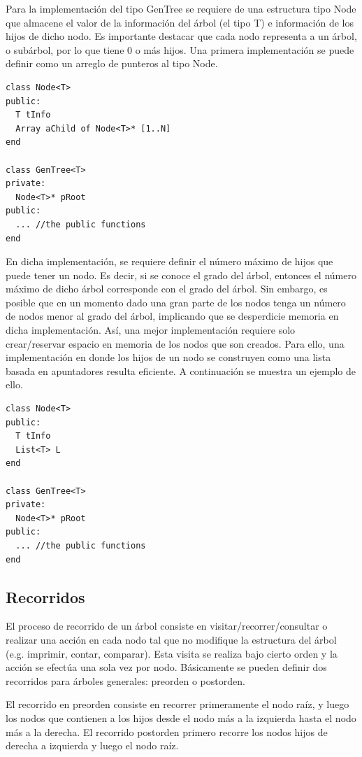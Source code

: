 Para la implementación del tipo GenTree se requiere de una estructura tipo Node que almacene el valor de la información del árbol (el tipo T) e información de los hijos de dicho nodo. Es importante destacar que cada nodo representa a un árbol, o subárbol, por lo que tiene 0 o más hijos. Una primera implementación se puede definir como un arreglo de punteros al tipo Node.

\begin{lstlisting}[upquote=true, language=pseudo]
class Node<T>
public:
  T tInfo
  Array aChild of Node<T>* [1..N]
end

class GenTree<T>
private:
  Node<T>* pRoot
public:
  ... //the public functions
end
\end{lstlisting}

En dicha implementación, se requiere definir el número máximo de hijos que puede tener un nodo. Es decir, si se conoce el grado del árbol, entonces el número máximo de dicho árbol corresponde con el grado del árbol. Sin embargo, es posible que en un momento dado una gran parte de los nodos tenga un número de nodos menor al grado del árbol, implicando que se desperdicie memoria en dicha implementación. Así, una mejor implementación requiere solo crear/reservar espacio en memoria de los nodos que son creados. Para ello, una implementación en donde los hijos de un nodo se construyen como una lista basada en apuntadores resulta eficiente. A continuación se muestra un ejemplo de ello.

\begin{lstlisting}[upquote=true, language=pseudo]
class Node<T>
public:
  T tInfo
  List<T> L
end

class GenTree<T>
private:
  Node<T>* pRoot
public:
  ... //the public functions
end
\end{lstlisting}

\subsection{Recorridos}

El proceso de recorrido de un árbol consiste en visitar/recorrer/consultar o realizar una acción en cada nodo tal que no modifique la estructura del árbol (e.g. imprimir, contar, comparar). Esta visita se realiza bajo cierto orden y la acción se efectúa una sola vez por nodo. Básicamente se pueden definir dos recorridos para árboles generales: preorden o postorden.

El recorrido en preorden consiste en recorrer primeramente el nodo raíz, y luego los nodos que contienen a los hijos desde el nodo más a la izquierda hasta el nodo más a la derecha. El recorrido postorden primero recorre los nodos hijos de derecha a izquierda y luego el nodo raíz.

